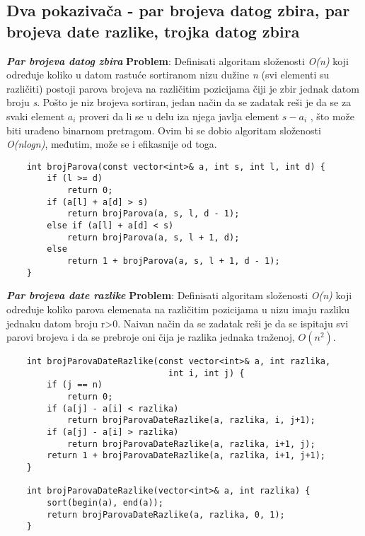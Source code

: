 \documentclass{article}
\begin{document}
\subsection{Dva pokazivača - par brojeva datog zbira, par brojeva date razlike, trojka datog zbira}
\textit{\textbf{Par brojeva datog zbira}}
\vspace{0.1cm}\newline
\textbf{Problem}: Definisati algoritam složenosti \textit{O(n)} koji određuje koliko u datom
rastuće sortiranom nizu dužine \textit{n} (svi elementi su različiti) postoji parova brojeva
na različitim pozicijama čiji je zbir jednak datom broju \textit{s}.
\newline
Pošto je niz brojeva sortiran, jedan način da se zadatak reši je da se za svaki
element $a_i$ proveri da li se u delu iza njega javlja element $s-a_i$ , što može biti
urađeno binarnom pretragom. Ovim bi se dobio algoritam složenosti \textit{O(nlogn)},
međutim, može se i efikasnije od toga. 
\begin{lstlisting}
    int brojParova(const vector<int>& a, int s, int l, int d) {
        if (l >= d) 
            return 0;
        if (a[l] + a[d] > s)
            return brojParova(a, s, l, d - 1);
        else if (a[l] + a[d] < s)
            return brojParova(a, s, l + 1, d);
        else
            return 1 + brojParova(a, s, l + 1, d - 1);
    }
\end{lstlisting}
\vspace{0.5cm}
\textit{\textbf{Par brojeva date razlike}}
\vspace{0.1cm}\newline
\textbf{Problem}: Definisati algoritam složenosti \textit{O(n)} koji određuje koliko parova
elemenata na različitim pozicijama u nizu imaju razliku jednaku datom broju
r>0.
\newline
Naivan način da se zadatak reši je da se ispitaju svi parovi brojeva i da se
prebroje oni čija je razlika jednaka traženoj, $O(n^2)$.
\begin{lstlisting}
    int brojParovaDateRazlike(const vector<int>& a, int razlika,
                                int i, int j) { 
        if (j == n)
            return 0;
        if (a[j] - a[i] < razlika)
            return brojParovaDateRazlike(a, razlika, i, j+1);
        if (a[j] - a[i] > razlika)
            return brojParovaDateRazlike(a, razlika, i+1, j);
        return 1 + brojParovaDateRazlike(a, razlika, i+1, j+1);
    }

    int brojParovaDateRazlike(vector<int>& a, int razlika) {
        sort(begin(a), end(a));
        return brojParovaDateRazlike(a, razlika, 0, 1);
    }
\end{lstlisting}
\end{document}

